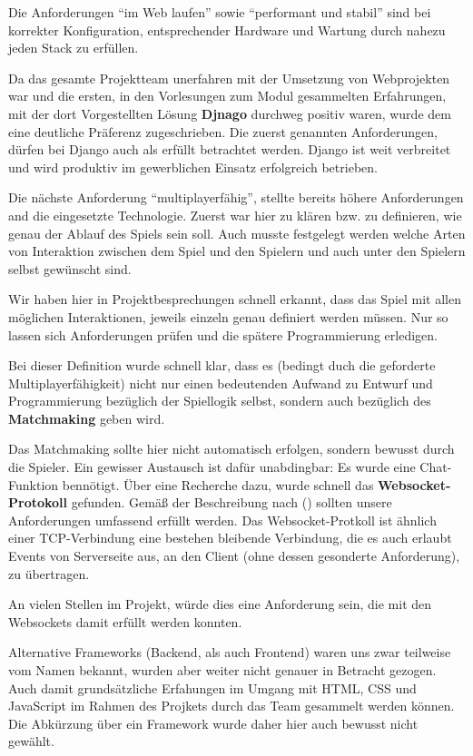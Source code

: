 Die Anforderungen \enquote{im Web laufen} sowie \enquote{performant und stabil} sind bei korrekter Konfiguration, entsprechender Hardware und Wartung durch nahezu jeden \ac{Stack} zu erfüllen. 

Da das gesamte Projektteam unerfahren mit der Umsetzung von Webprojekten war und die ersten, in den Vorlesungen zum Modul gesammelten Erfahrungen, mit der dort Vorgestellten Lösung \textbf{Djnago} durchweg positiv waren, wurde dem eine deutliche Präferenz zugeschrieben. Die zuerst genannten Anforderungen, dürfen bei Django auch als erfüllt betrachtet werden. Django ist weit verbreitet und wird produktiv im gewerblichen Einsatz erfolgreich betrieben. 

Die nächste Anforderung \enquote{multiplayerfähig}, stellte bereits höhere Anforderungen and die eingesetzte Technologie. Zuerst war hier zu klären bzw. zu definieren, wie genau der Ablauf des Spiels sein soll. Auch musste festgelegt werden welche Arten von Interaktion zwischen dem Spiel und den Spielern und auch unter den Spielern selbst gewünscht sind. 

Wir haben hier in Projektbesprechungen schnell erkannt, dass das Spiel mit allen möglichen Interaktionen, jeweils einzeln genau definiert werden müssen. Nur so lassen sich Anforderungen prüfen und die spätere Programmierung erledigen. 

Bei dieser Definition wurde schnell klar, dass es (bedingt duch die geforderte Multiplayerfähigkeit) nicht nur einen bedeutenden Aufwand zu Entwurf und Programmierung bezüglich der Spiellogik selbst, sondern auch bezüglich des \textbf{\gls{Matchmaking}} geben wird. 

Das \gls{Matchmaking} sollte hier nicht automatisch erfolgen, sondern bewusst durch die Spieler. Ein gewisser Austausch ist dafür unabdingbar: Es wurde eine Chat-Funktion bennötigt. Über eine Recherche dazu, wurde schnell das \textbf{Websocket-Protokoll} gefunden. Gemäß der Beschreibung nach \citeauthor{heise-django-2011} (\citeyear{heise-django-2011}) sollten unsere Anforderungen umfassend erfüllt werden. Das Websocket-Protkoll ist ähnlich einer TCP-Verbindung eine bestehen bleibende Verbindung, die es auch erlaubt Events von Serverseite aus, an den Client (ohne dessen gesonderte Anforderung), zu übertragen. 

An vielen Stellen im Projekt, würde dies eine Anforderung sein, die mit den Websockets damit erfüllt werden konnten. 

Alternative Frameworks (Backend, als auch Frontend) waren uns zwar teilweise vom Namen bekannt, wurden aber weiter nicht genauer in Betracht gezogen. Auch damit grundsätzliche Erfahungen im Umgang mit HTML, CSS und JavaScript im Rahmen des Projkets durch das Team gesammelt werden können. Die Abkürzung über ein Framework wurde daher hier auch bewusst nicht gewählt. 


